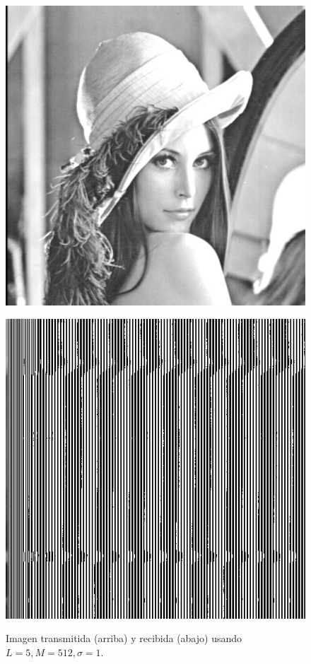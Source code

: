 \documentclass[10pt,journal,compsoc]{IEEEtran}
\begin{document}
\begin{figure}
\begin{center}
\label{fig:refuerzos2}
\centering
\begin{minipage}{.5\textwidth}
  \centering

  \includegraphics[scale=0.25]{../Linterno5/512/5/imgTrans.jpg}
  \label{fig:sub1}
\end{minipage}
\vspace{0cm}
\begin{minipage}{.5\textwidth}
  \centering
  \includegraphics[scale=0.25]{../Linterno5/512/5/imgRec.jpg}
  \label{fig:sub2}
\end{minipage}
\caption{Imagen transmitida (arriba) y recibida (abajo) usando $L=5 , M=512, \sigma=1$.}
\label{fig:test}
\end{center}
\end{figure}
\end{document}
